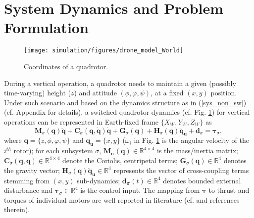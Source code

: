 \documentclass[AMA,STIX1COL,sort, compress]{WileyNJD-v2}
\begin{document}
\section{System Dynamics and Problem Formulation}
\begin{figure}[!h]
	\centering
	\texttt{[image: simulation/figures/drone\_model\_World]}%
	\caption{{Coordinates of a quadrotor.}}\label{fig:dyn} %
\end{figure}
During a vertical operation, a quadrotor needs to maintain a given (possibly time-varying) height ($z$) and attitude $(\phi, \varphi, \psi)$, at a fixed $(x,y)$ position. Under such scenario and based on the dynamics structure as in (\ref{sys_non_sw}) (cf. Appendix for details),  a switched quadrotor dynamics (cf. Fig. \ref{fig:dyn}) for vertical operations can be represented in Earth-fixed frame $\lbrace X_W, Y_W , Z_W \rbrace$ as 
\begin{equation}\label{sys_1}
\mathbf M_{\sigma}( \mathbf q)\ddot{ \mathbf q}+\mathbf C_{\sigma}(\mathbf q,\dot{\mathbf q})\dot{\mathbf q}+\mathbf G_{\sigma}(\mathbf q)+\mathbf{H}_\sigma( \mathbf q)\ddot{ \mathbf{q}}_{\mathbf u}+\mathbf{ d}_{\sigma}=\boldsymbol \tau_{\sigma},
\end{equation} 
where $\mathbf{q}=\lbrace z, \phi, \varphi, \psi \rbrace$ and $\mathbf{q_u}=\lbrace x,y \rbrace$ ($\omega_i$ in Fig. \ref{fig:dyn} is the angular velocity of the $i^{th}$ rotor); for each subsystem $\sigma$, $\mathbf{M_{\sigma}(q)}\in\mathbb{R}^{4\times 4}$ is the mass/inertia matrix; $\mathbf C_{\sigma}(\mathbf q,\dot{\mathbf q})\in\mathbb{R}^{4 \times 4}$ denote the Coriolis, centripetal terms; $\mathbf G_{\sigma}(\mathbf q)\in\mathbb{R}^{4}$ denotes the gravity vector; $\mathbf{H}_\sigma( \mathbf q)\ddot{ \mathbf{q}}_{\mathbf u}\in\mathbb{R}^{4}$ represents the vector of cross-coupling terms stemming from $(x,y)$ sub-dynamics; $\mathbf{ d_{\sigma}}(t) \in \mathbb{R}^4$ denotes bounded external disturbance and $\boldsymbol \tau_{\sigma} \in \mathbb{R}^4$ is the control input. The mapping from $\mathbf \tau$ to thrust and torques of individual motors are well reported in literature (cf. \cite{tang2015mixed} and references therein). %
\end{document}
